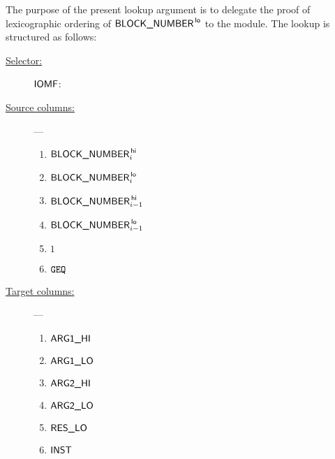 The purpose of the present lookup argument is to delegate the proof of lexicographic ordering of $\textsf{BLOCK\_NUMBER}^{\mathsf{\,lo}}$ to the \wcpMod{} module.
The lookup is structured as follows:
\begin{description}
	\item[\underline{Selector:}] $\textsf{IOMF}$:
	\item[\underline{Source columns:}] ---
		\begin{multicols}{3}
			\begin{enumerate}
				\item $\textsf{BLOCK\_NUMBER}^{\mathsf{\,hi}}_{i}$
				\item $\textsf{BLOCK\_NUMBER}^{\mathsf{\,lo}}_{i}$
				\item $\textsf{BLOCK\_NUMBER}^{\mathsf{\,hi}}_{i-1}$
				\item $\textsf{BLOCK\_NUMBER}^{\mathsf{\,lo}}_{i-1}$
				\item $1$
				\item $\texttt{GEQ}$
			\end{enumerate}
		\end{multicols}
	\item[\underline{Target columns:}] ---
		\begin{multicols}{3}
		\begin{enumerate}
			\item $\textsf{ARG}\textsf{1}\textsf{\_HI}$
			\item $\textsf{ARG}\textsf{1}\textsf{\_LO}$
			\item $\textsf{ARG}\textsf{2}\textsf{\_HI}$
			\item $\textsf{ARG}\textsf{2}\textsf{\_LO}$
			\item $\textsf{RES}\textsf{\_LO}$
			\item $\textsf{INST}$
		\end{enumerate}
		\end{multicols}
\end{description}
